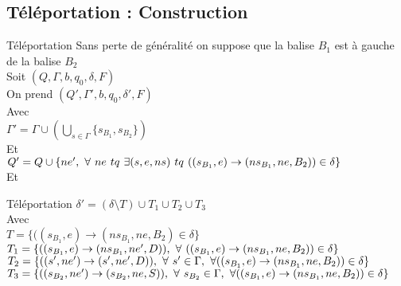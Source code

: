 \documentclass[12pt]{beamer}
\begin{document}
\subsection{Téléportation : Construction}
\begin{frame}{Téléportation}
    Sans perte de généralité on suppose que la balise $B_1$ est à gauche de la balise $B_2$\\
    Soit $(Q, \Gamma, b, q_0, \delta, F)$\\
    On prend $(Q', \Gamma', b, q_0, \delta', F)$\\
    Avec\\
    $\Gamma' = \Gamma \cup (\bigcup\limits_{s\in\Gamma} \{s_{B_1}, s_{B_2}\})$\\
    Et\\
    $Q' = Q \cup \{ne',\hspace{0.125cm}\forall \hspace{0.125cm} ne \hspace{0.125cm} tq \hspace{0.125cm} \exists (s,e,ns) \hspace{0.125cm} tq  \hspace{0.125cm} ((s_{B_1},e)\rightarrow(ns_{B_1},ne,B_2)) \in \delta\} $ \\
    Et\\
\end{frame}
\begin{frame}{Téléportation}
    $\delta' = (\delta\setminus T) \cup T_1 \cup T_2 \cup T_3$\\
    Avec\\
    $T = \{((s_{B_1},e)\rightarrow(ns_{B_1},ne,B_2) \in \delta \}$ \\
    $T_1 = \{((s_{B_1},e)\rightarrow(ns_{B_1},ne',D)),\hspace{0.125cm}
    \forall \hspace{0.125cm} ((s_{B_1},e)\rightarrow(ns_{B_1},ne,B_2)) \in \delta\}$\\
    $T_2 = \{((s',ne')\rightarrow(s',ne',D)),\hspace{0.125cm}\forall \hspace{0.125cm} s' \in \Gamma, \hspace{0.125cm} \forall((s_{B_1},e)\rightarrow(ns_{B_1},ne,B_2)) \in \delta\}$\\
    $T_3 = \{((s_{B_2},ne')\rightarrow(s_{B_2},ne,S)),\hspace{0.125cm}\forall \hspace{0.125cm} s_{B_2} \in \Gamma, \hspace{0.125cm} \forall((s_{B_1},e)\rightarrow(ns_{B_1},ne,B_2)) \in \delta\}$\\
\end{frame}
\end{document}
